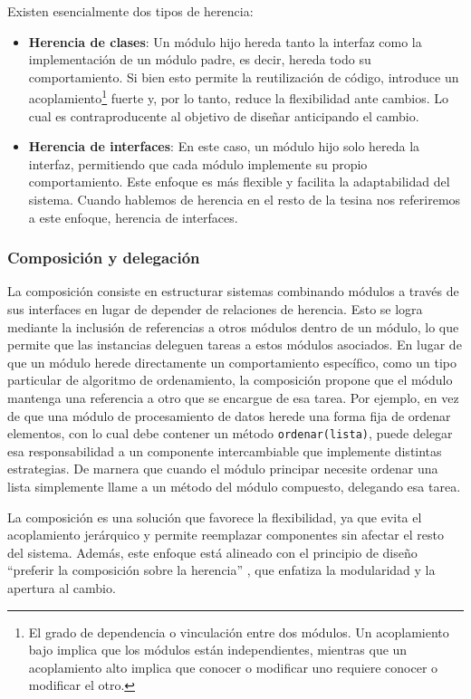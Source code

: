 Existen esencialmente dos tipos de herencia:

\begin{itemize}
\item \textbf{Herencia de clases}: Un módulo hijo hereda tanto la interfaz como la implementación de un módulo padre, es decir, hereda todo su comportamiento. Si bien esto permite la reutilización de código, introduce un acoplamiento\footnote{El grado de dependencia o vinculación entre dos módulos. Un acoplamiento bajo implica que los módulos están independientes, mientras que un acoplamiento alto implica que conocer o modificar uno requiere conocer o modificar el otro.} fuerte y, por lo tanto, reduce la flexibilidad ante cambios. Lo cual es contraproducente al objetivo de diseñar anticipando el cambio.
\item \textbf{Herencia de interfaces}: En este caso, un módulo hijo solo hereda la interfaz, permitiendo que cada módulo implemente su propio comportamiento. Este enfoque es más flexible y facilita la adaptabilidad del sistema. Cuando hablemos de herencia en el resto de la tesina nos referiremos a este enfoque, herencia de interfaces.
\end{itemize}



\subsubsection*{Composición y delegación}
La composición consiste en estructurar sistemas combinando módulos a través de sus interfaces en lugar de depender de relaciones de herencia. Esto se logra mediante la inclusión de referencias a otros módulos dentro de un módulo, lo que permite que las instancias deleguen tareas a estos módulos asociados. En lugar de que un módulo herede directamente un comportamiento específico, como un tipo particular de algoritmo de ordenamiento, la composición propone que el módulo mantenga una referencia a otro que se encargue de esa tarea. Por ejemplo, en vez de que una módulo de procesamiento de datos herede una forma fija de ordenar elementos, con lo cual debe contener un método \verb|ordenar(lista)|, puede delegar esa responsabilidad a un componente intercambiable que implemente distintas estrategias. De marnera que cuando el módulo principar necesite ordenar una lista simplemente llame a un método del módulo compuesto, delegando esa tarea.

 La composición es una solución que favorece la flexibilidad, ya que evita el acoplamiento jerárquico y permite reemplazar componentes sin afectar el resto del sistema. Además, este enfoque está alineado con el principio de diseño ``preferir la composición sobre la herencia'' \cite{Gamma:1995:DPE:186897}, que enfatiza la modularidad y la apertura al cambio.

